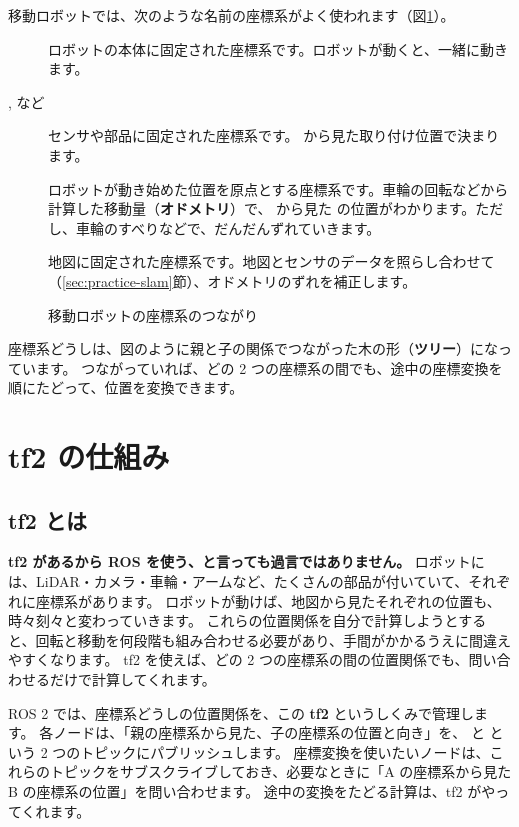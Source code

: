 移動ロボットでは、次のような名前の座標系がよく使われます（図\ref{fig:tf-viz-frame-tree}）。

\begin{description}
  \item[] ロボットの本体に固定された座標系です。ロボットが動くと、一緒に動きます。
  \item[,  など] センサや部品に固定された座標系です。 から見た取り付け位置で決まります。
  \item[] ロボットが動き始めた位置を原点とする座標系です。車輪の回転などから計算した移動量（\textbf{オドメトリ}）で、 から見た  の位置がわかります。ただし、車輪のすべりなどで、だんだんずれていきます。
  \item[] 地図に固定された座標系です。地図とセンサのデータを照らし合わせて（\ref{sec:practice-slam}節）、オドメトリのずれを補正します。
\end{description}

\begin{figure}[tb]
  \centering
  
  \caption{移動ロボットの座標系のつながり}
  \label{fig:tf-viz-frame-tree}
\end{figure}

座標系どうしは、図のように親と子の関係でつながった木の形（\textbf{ツリー}）になっています。
つながっていれば、どの 2 つの座標系の間でも、途中の座標変換を順にたどって、位置を変換できます。

\section{tf2 の仕組み}
\label{sec:tf-viz-tf2}

\subsection{tf2 とは}

\textbf{tf2 があるから ROS を使う、と言っても過言ではありません。}
ロボットには、LiDAR・カメラ・車輪・アームなど、たくさんの部品が付いていて、それぞれに座標系があります。
ロボットが動けば、地図から見たそれぞれの位置も、時々刻々と変わっていきます。
これらの位置関係を自分で計算しようとすると、回転と移動を何段階も組み合わせる必要があり、手間がかかるうえに間違えやすくなります。
tf2 を使えば、どの 2 つの座標系の間の位置関係でも、問い合わせるだけで計算してくれます。

ROS 2 では、座標系どうしの位置関係を、この \textbf{tf2} というしくみで管理します。
各ノードは、「親の座標系から見た、子の座標系の位置と向き」を、 と  という 2 つのトピックにパブリッシュします。
座標変換を使いたいノードは、これらのトピックをサブスクライブしておき、必要なときに「A の座標系から見た B の座標系の位置」を問い合わせます。
途中の変換をたどる計算は、tf2 がやってくれます。

